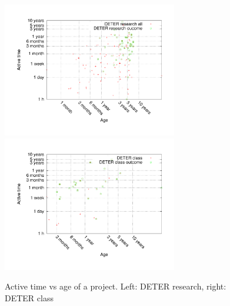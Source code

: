 \begin{figure}[htbp] \begin{center} \includegraphics[width=3in,
type=pdf,ext=.pdf,read=.pdf]{figs/proj.agevsactive.res.gnu}
\includegraphics[width=3in,
type=pdf,ext=.pdf,read=.pdf]{figs/proj.agevsactivecl.gnu}
\caption{Active time vs age of a project. Left: DETER research, right:
DETER class} \label{projagevsactive} \end{center} \end{figure}

